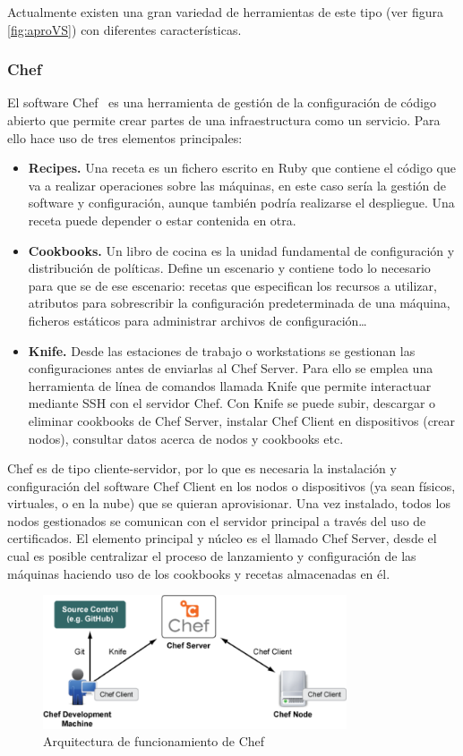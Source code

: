	Actualmente existen una gran variedad de herramientas de este tipo (ver figura \ref{fig:aproVS}) con diferentes características.

\subsubsection{Chef}
	El software Chef~\cite{chef1} es una herramienta de gestión de la configuración de código abierto que permite crear partes de una infraestructura como un servicio. Para ello hace uso de tres elementos principales:~\cite{chef2}
	\begin{itemize}
		\item \textbf{Recipes.} Una receta es un fichero escrito en Ruby que contiene el código que va a realizar operaciones sobre las máquinas, en este caso sería la gestión de software y configuración, aunque también podría realizarse el despliegue. Una receta puede depender o estar contenida en otra.
		\item \textbf{Cookbooks.} Un libro de cocina es la unidad fundamental de configuración y distribución de políticas. Define un escenario y contiene todo lo necesario para que se de ese escenario: recetas que especifican los recursos a utilizar, atributos para sobrescribir la configuración predeterminada de una máquina, ficheros estáticos para administrar archivos de configuración…
		\item \textbf{Knife.} Desde las estaciones de trabajo o workstations se gestionan las configuraciones antes de enviarlas al Chef Server. Para ello se emplea una herramienta de línea de comandos llamada Knife que permite interactuar mediante SSH con el servidor Chef. Con Knife se puede subir, descargar o eliminar cookbooks de Chef Server, instalar Chef Client en dispositivos (crear nodos), consultar datos acerca de nodos y cookbooks etc.
	\end{itemize}

	Chef es de tipo cliente-servidor, por lo que es necesaria la instalación y configuración del software Chef Client en los nodos o dispositivos (ya sean físicos, virtuales, o en la nube) que se quieran aprovisionar. Una vez instalado, todos los nodos gestionados se comunican con el servidor principal a través del uso de certificados. El elemento principal y núcleo es el llamado Chef Server, desde el cual es posible centralizar el proceso de lanzamiento y configuración de las máquinas haciendo uso de los cookbooks y recetas almacenadas en él.

	\begin{figure}[h]
	\centering
	\includegraphics[width=0.8\textwidth]{../imgs/EdA/arquitectura-chef.png}
	\caption{Arquitectura de funcionamiento de Chef}
	\label{fig:chef-arch}
	\end{figure}
	\clearpage


